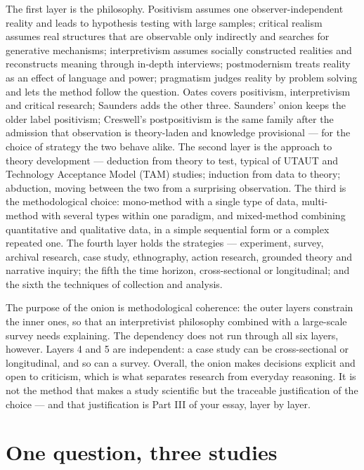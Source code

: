 \documentclass[11pt,a4paper,british,twoside=false,headings=small,chapterprefix=false,numbers=noenddot]{scrbook}
\begin{document}
The first layer is the philosophy. Positivism assumes one observer-independent reality and leads to hypothesis testing with large samples; critical realism assumes real structures that are observable only indirectly and searches for generative mechanisms; interpretivism assumes socially constructed realities and reconstructs meaning through in-depth interviews; postmodernism treats reality as an effect of language and power; pragmatism judges reality by problem solving and lets the method follow the question. Oates covers positivism, interpretivism and critical research; Saunders adds the other three. Saunders' onion keeps the older label positivism; Creswell's postpositivism is the same family after the admission that observation is theory-laden and knowledge provisional --- for the choice of strategy the two behave alike. The second layer is the approach to theory development --- deduction from theory to test, typical of UTAUT and Technology Acceptance Model (TAM) studies; induction from data to theory; abduction, moving between the two from a surprising observation. The third is the methodological choice: mono-method with a single type of data, multi-method with several types within one paradigm, and mixed-method combining quantitative and qualitative data, in a simple sequential form or a complex repeated one. The fourth layer holds the strategies --- experiment, survey, archival research, case study, ethnography, action research, grounded theory and narrative inquiry; the fifth the time horizon, cross-sectional or longitudinal; and the sixth the techniques of collection and analysis.

The purpose of the onion is methodological coherence: the outer layers constrain the inner ones, so that an interpretivist philosophy combined with a large-scale survey needs explaining. The dependency does not run through all six layers, however. Layers 4 and 5 are independent: a case study can be cross-sectional or longitudinal, and so can a survey. Overall, the onion makes decisions explicit and open to criticism, which is what separates research from everyday reasoning. It is not the method that makes a study scientific but the traceable justification of the choice --- and that justification is Part III of your essay, layer by layer.

\section{One question, three studies}
\end{document}
